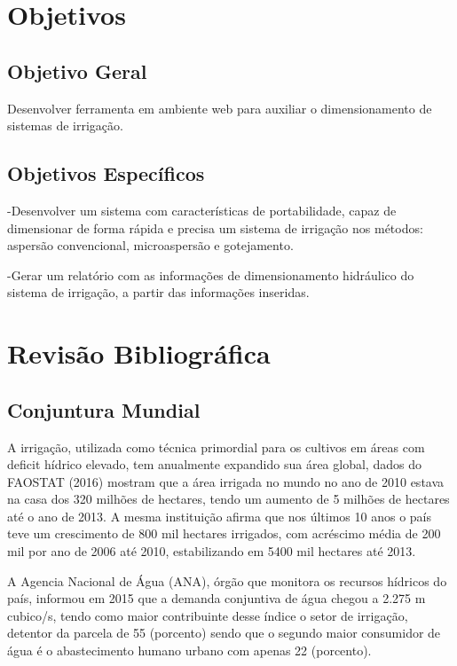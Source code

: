 \chapter{Objetivos}
\label{CAP2}
\section{Objetivo Geral}

Desenvolver ferramenta em ambiente web para auxiliar o dimensionamento de sistemas de irrigação.

\section{Objetivos Específicos}

-Desenvolver um sistema com características de portabilidade, capaz de dimensionar de forma rápida e precisa um sistema de irrigação nos métodos: aspersão convencional, microaspersão e gotejamento.

-Gerar um relatório com as informações de dimensionamento hidráulico do sistema de irrigação, a partir das informações inseridas.

\chapter{Revisão Bibliográfica}
\label{CAP2}



\section{Conjuntura Mundial}\label{Sub:equa}

A irrigação, utilizada como técnica primordial para os cultivos em áreas com deficit hídrico elevado, tem anualmente expandido sua área global, dados do FAOSTAT (2016) mostram que a área irrigada no mundo no ano de 2010 estava na casa dos 320 milhões de hectares, tendo um aumento de 5 milhões de hectares até o ano de 2013.
A mesma instituição afirma que nos últimos 10 anos o país teve um crescimento de 800 mil hectares irrigados, com acréscimo média de 200 mil por ano de 2006 até 2010, estabilizando em 5400 mil hectares até 2013.  

A Agencia Nacional de Água (ANA), órgão que monitora os recursos hídricos do país, informou em 2015 que a demanda conjuntiva de água chegou a 2.275 m cubico/s, tendo como maior contribuinte desse índice o setor de irrigação, detentor da parcela de 55 (porcento) sendo que o segundo maior consumidor de água é o abastecimento humano urbano com apenas 22 (porcento).

